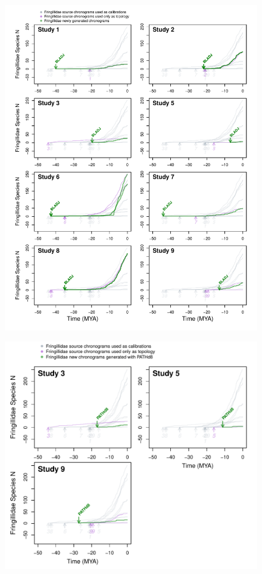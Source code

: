 \documentclass[]{article}
\begin{document}
\begin{figure}[!h]
\includegraphics{fig_crossval_bladj.pdf}
\caption{}
\label{fig:cvbladj}
\end{figure}

\newpage

\begin{figure}[!h]
\includegraphics{fig_crossval_boldsumm.pdf}
\caption{}
\label{fig:cvbold}
\end{figure}
\end{document}
